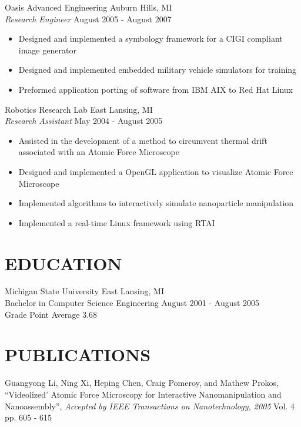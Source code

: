 \documentclass[line]{res}
\begin{document}
\begin{resume}
    \vspace{-2mm}
    Oasis Advanced Engineering \hfill Auburn Hills, MI\\
    {\sl Research Engineer} \hfill August 2005 - August 2007
    \vspace{1mm}
    \begin{itemize}
      \item Designed and implemented a symbology framework for a CIGI compliant image generator
      \item Designed and implemented embedded military vehicle simulators for training
      \item Preformed application porting of software from IBM AIX to Red Hat Linux 
    \end{itemize}

    \vspace{-2mm}
    Robotics Research Lab \hfill East Lansing, MI\\
    {\sl Research Assistant} \hfill May 2004 - August 2005
    \vspace{1mm}
    \begin{itemize}
      \item Assisted in the development of a method to circumvent thermal drift associated with an Atomic Force Microscope
      \item Designed and implemented a OpenGL application to visualize Atomic Force Microscope
      \item Implemented algorithms to interactively simulate nanoparticle manipulation
      \item Implemented a real-time Linux framework using RTAI
    \end{itemize}

\section{EDUCATION}
\vspace{1mm}
   Michigan State University \hfill East Lansing, MI\\
   Bachelor in Computer Science Engineering \hfill August 2001 - August 2005\\
   Grade Point Average 3.68\\

\vspace{-5mm}
\section{PUBLICATIONS}
   \vspace{1mm}
   Guangyong Li, Ning Xi, Heping Chen, Craig Pomeroy, and Mathew Prokos,
   ``Videolized' Atomic Force Microscopy for Interactive Nanomanipulation and Nanoassembly'',
   \textsl{Accepted by IEEE Transactions on Nanotechnology, 2005} Vol. 4 pp. 605 - 615


\end{resume}
\end{document}
